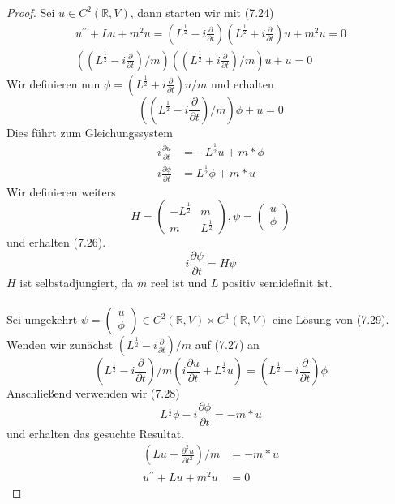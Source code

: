 \documentclass[11pt,a4paper,leqno]{report}
\numberwithin{equation}{chapter}
\begin{document}
\begin{proof}
	Sei $u\in C^2(\mathbb{R}, V)$, dann starten wir mit (7.24)
	\begin{align*}
		u^{\prime \prime} + Lu + m^2u=
		(L^\frac{1}{2} - i\frac{\partial}{\partial t})(L^\frac{1}{2} + i\frac{\partial}{\partial t})u + m^2 u=0\\
		((L^\frac{1}{2} - i\frac{\partial}{\partial t})/m)((L^\frac{1}{2} + i\frac{\partial}{\partial t})/m)u + u=0
	\end{align*}
	Wir definieren nun $\phi = (L^\frac{1}{2} + i \frac{\partial}{\partial t})u/m$ und erhalten
	\begin{equation*}
		((L^\frac{1}{2} - i\frac{\partial}{\partial t})/m)\phi + u=0
	\end{equation*}
	Dies f\"uhrt zum Gleichungssystem
	\begin{align}
		i \frac{\partial u}{\partial t} &= -L^\frac{1}{2}u + m*\phi\\
		i\frac{\partial\phi}{\partial t}&=L^\frac{1}{2}\phi + m*u
	\end{align}
	 Wir definieren weiters
	 \begin{equation*}
	 	H=\begin{pmatrix}
	 		-L^\frac{1}{2} & m \\ 
	 		m & L^\frac{1}{2}
	 	\end{pmatrix}, \psi =\begin{pmatrix}
	 	u \\ \phi
 	\end{pmatrix}
	 \end{equation*}
	 und erhalten (7.26).
	 \begin{equation}
	 	i\frac{\partial\psi}{\partial t} = H\psi
	 \end{equation}
 	$H$ ist selbstadjungiert, da $m$ reel ist und $L$ positiv semidefinit ist.\\
 	\\
 	Sei umgekehrt $\psi =\begin{pmatrix} u \\ \phi\end{pmatrix}\in C^2(\mathbb{R},V)\times C^1(\mathbb{R},V)$ eine L\"osung von (7.29). Wenden wir zun\"achst  $(L^\frac{1}{2}-i \frac{\partial}{\partial t})/m$ auf (7.27) an
 	\begin{equation*}
 		(L^\frac{1}{2}-i \frac{\partial}{\partial t})/m(i \frac{\partial u}{\partial t} + L^\frac{1}{2}u) = (L^\frac{1}{2}-i \frac{\partial}{\partial t})\phi
 	\end{equation*}
 	Anschlie\ss{}end verwenden wir (7.28) 
 	\begin{equation*}
 		L^\frac{1}{2}\phi - i\frac{\partial\phi}{\partial t} =-m*u
 	\end{equation*}
 	und erhalten das gesuchte Resultat.
 	\begin{align*}
 		(Lu+\frac{\partial^2u}{\partial t^2})/m &=-m*u\\
 		u^{\prime\prime} + Lu+m^2 u&= 0
 	\end{align*}
\end{proof}
\end{document}
